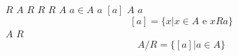 \documentclass{article}
\begin{document}
$R$
$A$
$R$
$R$
$R$
$A$
$a \in A$
$a$
$[a]$
$A$
$a$
$$
[a] = \{x | x \in A \text{ e } x R a\}
$$
$A$
$R$
$$
A/R = \{[a] | a \in A\}
$$
\end{document}
